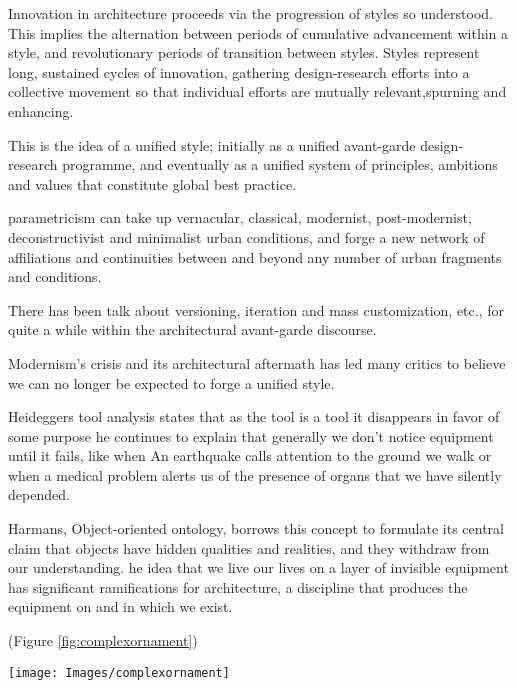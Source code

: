 
Innovation in architecture proceeds via the progression of styles so understood.
This implies the alternation between periods of cumulative advancement within a style, and revolutionary periods of transition between styles.
Styles represent long, sustained cycles of innovation, gathering design-research efforts into a collective movement so that individual efforts are mutually relevant,spurning and enhancing.\cite{Schumacher2010}

This is the idea of a unified style;
initially as a unified avant-garde design-research programme, and eventually as a unified system of principles, ambitions and values that constitute global best practice.\cite{Schumacher2010}


parametricism can take up vernacular, classical, modernist, post-modernist, deconstructivist and minimalist urban conditions, and forge a new network of affiliations and continuities between and beyond any number of urban fragments and conditions. \cite{Schumacher2010}


There has been talk about versioning, iteration and mass customization, etc., for quite a while within the architectural avant-garde discourse. \cite{Schumacher2008}

Modernism’s crisis and its architectural aftermath has led many critics to believe we can no longer be expected to forge a unified style.\cite{Schumacher2010}

Heideggers tool analysis states that as the tool is a tool it disappears in favor of some purpose he continues to explain that generally we don't notice equipment until it fails, like when An earthquake calls attention to the ground we walk or when a medical problem alerts us of the presence of organs that we have silently depended\cite{Harman2011}.

Harmans, Object-oriented ontology, borrows this concept to formulate its central claim that objects have hidden qualities and realities, and they withdraw from our understanding.\cite{Gage2015}
he idea that we live our lives on a layer of invisible equipment has significant ramifications for architecture, a discipline that produces the equipment on and in which we exist.\cite{Gage2015}

(Figure \ref{fig:complexornament})

     \begin{figure*}[htb]
          \centering
          \texttt{[image: Images/complexornament]}
          \caption{Complex ornament reference  (\textit{Images edited from source)}}
          \label{fig:complexornament}
        \end{figure*}

